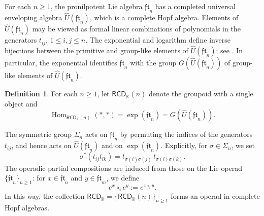 \documentclass{amsart}
\newcommand{\kk}{\mathbb{K}}    %
\newcommand{\RCD}{\mathsf{RCD}}
\newcommand{\hRCD}{{\RCD}_{\kk}}
\newcommand{\Hom}{\operatorname{Hom}}
\newcommand{\lrar}{\ensuremath{\longrightarrow}}
\theoremstyle{definition}
\newtheorem{definition}[theorem]{Definition}%
\numberwithin{equation}{section}
\begin{document}
For each $n\geq 1$, the pronilpotent Lie algebra $\mathfrak{ft}_n$ has a completed universal enveloping algebra $\hat U(\mathfrak{ft}_n)$, which is a complete Hopf algebra. Elements of $\hat U(\mathfrak{ft}_n)$ may be viewed as formal linear combinations of polynomials in the generators $t_{ij}$, $1\leq i,j\leq n$. The exponential and logarithm define inverse bijections between the primitive and group-like elements of $\hat U(\mathfrak{ft}_n)$; see \cite[Proposition 8.1.5]{FresseBook1}. In particular, the exponential identifies $\mathfrak{ft}_n$ with the group $G(\hat U(\mathfrak{ft}_n))$ of group-like elements of $\hat U(\mathfrak{ft}_n)$.

\begin{definition}
For each $n\geq 1$, let $\hRCD(n)$ denote the groupoid with a single object and
\[
\Hom_{\hRCD(n)}(*,*)=\exp(\mathfrak{ft}_n)=G(\hat U(\mathfrak{ft}_n)).
\]
\end{definition}

The symmetric group $\Sigma_n$ acts on $\mathfrak{ft}_n$ by permuting the indices of the generators $t_{ij}$, and hence acts on $\hat U(\mathfrak{ft}_n)$ and on $\exp(\mathfrak{ft}_n)$. Explicitly, for $\sigma\in \Sigma_n$, we set
\[
\sigma^*(t_{ij}t_{lk}) = t_{\sigma(i)\sigma(j)}\, t_{\sigma(l)\sigma(k)}.
\]
The operadic partial compositions are induced from those on the Lie operad $\{\mathfrak{ft}_n\}_{n\geq 1}$: for $x\in \mathfrak{ft}_n$ and $y\in \mathfrak{ft}_m$, we define
\[
e^x\circ_i e^y := e^{x\circ_i y}.
\]
In this way, the collection $\hRCD=\{\hRCD(n)\}_{n\geq 1}$ forms an operad in complete Hopf algebras.

\end{document}
